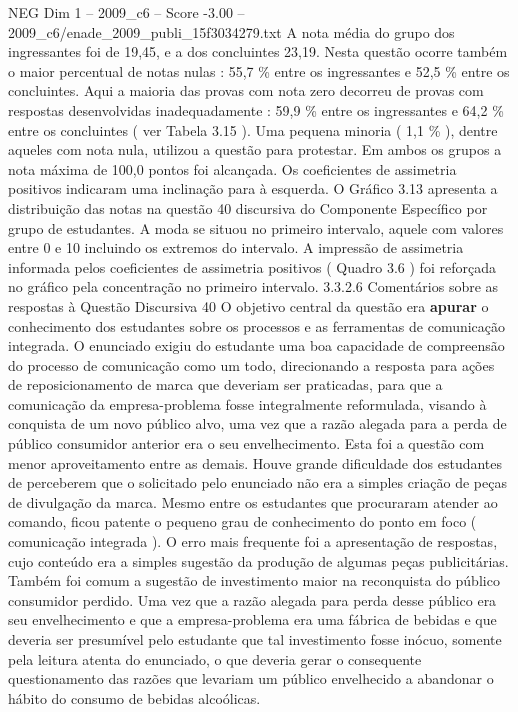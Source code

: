 \begin{textsample}{NEG Dim 1 – 2009\_c6 – Score -3.00 – 2009\_c6/enade\_2009\_publi\_15f3034279.txt}
A nota média do grupo dos ingressantes foi de 19,45, e a dos concluintes 23,19.
Nesta questão ocorre também o maior percentual de notas nulas : 55,7 \% entre os ingressantes e 52,5 \% entre os concluintes.
Aqui a maioria das provas com nota zero decorreu de provas com respostas desenvolvidas inadequadamente : 59,9 \% entre os ingressantes e 64,2 \% entre os concluintes ( ver Tabela 3.15 ).
Uma pequena minoria ( 1,1 \% ), dentre aqueles com nota nula, utilizou a questão para protestar.
Em ambos os grupos a nota máxima de 100,0 pontos foi alcançada.
Os coeficientes de assimetria positivos indicaram uma inclinação para à esquerda.
O Gráfico 3.13 apresenta a distribuição das notas na questão 40 discursiva do Componente Específico por grupo de estudantes.
A moda se situou no primeiro intervalo, aquele com valores entre 0 e 10 incluindo os extremos do intervalo.
A impressão de assimetria informada pelos coeficientes de assimetria positivos ( Quadro 3.6 ) foi reforçada no gráfico pela concentração no primeiro intervalo. 3.3.2.6 Comentários sobre as respostas à Questão Discursiva 40 O objetivo central da questão era \textbf{apurar} o conhecimento dos estudantes sobre os processos e as ferramentas de comunicação integrada.
O enunciado exigiu do estudante uma boa capacidade de compreensão do processo de comunicação como um todo, direcionando a resposta para ações de reposicionamento de marca que deveriam ser praticadas, para que a comunicação da empresa-problema fosse integralmente reformulada, visando à conquista de um novo público alvo, uma vez que a razão alegada para a perda de público consumidor anterior era o seu envelhecimento.
Esta foi a questão com menor aproveitamento entre as demais.
Houve grande dificuldade dos estudantes de perceberem que o solicitado pelo enunciado não era a simples criação de peças de divulgação da marca.
Mesmo entre os estudantes que procuraram atender ao comando, ficou patente o pequeno grau de conhecimento do ponto em foco ( comunicação integrada ).
O erro mais frequente foi a apresentação de respostas, cujo conteúdo era a simples sugestão da produção de algumas peças publicitárias.
Também foi comum a sugestão de investimento maior na reconquista do público consumidor perdido.
Uma vez que a razão alegada para perda desse público era seu envelhecimento e que a empresa-problema era uma fábrica de bebidas e que deveria ser presumível pelo estudante que tal investimento fosse inócuo, somente pela leitura atenta do enunciado, o que deveria gerar o consequente questionamento das razões que levariam um público envelhecido a abandonar o hábito do consumo de bebidas alcoólicas.

\end{textsample}

